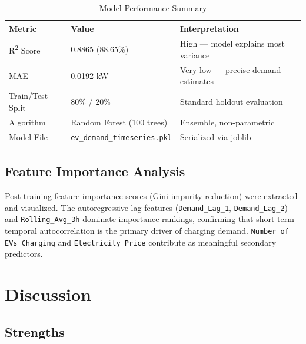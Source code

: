 \documentclass[12pt, a4paper]{article}
\begin{document}
\vspace{0.6em}

\begin{table}[h!]
\centering
\caption{Model Performance Summary}
\renewcommand{\arraystretch}{1.4}
\begin{tabular}{lll}
\toprule
\rowcolor{tableheader}
\color{white}\textbf{Metric} &
\color{white}\textbf{Value} &
\color{white}\textbf{Interpretation} \\
\midrule
R\textsuperscript{2} Score & 0.8865 (88.65\%) & High --- model explains most variance \\
\rowcolor{lightgray}
MAE                        & 0.0192 kW        & Very low --- precise demand estimates \\
Train/Test Split           & 80\% / 20\%      & Standard holdout evaluation \\
\rowcolor{lightgray}
Algorithm                  & Random Forest (100 trees) & Ensemble, non-parametric \\
Model File                 & \texttt{ev\_demand\_timeseries.pkl} & Serialized via joblib \\
\bottomrule
\end{tabular}
\end{table}

\subsection{Feature Importance Analysis}

Post-training feature importance scores (Gini impurity reduction) were extracted and
visualized. The autoregressive lag features (\texttt{Demand\_Lag\_1},
\texttt{Demand\_Lag\_2}) and \texttt{Rolling\_Avg\_3h} dominate importance rankings,
confirming that short-term temporal autocorrelation is the primary driver of charging
demand. \texttt{Number of EVs Charging} and \texttt{Electricity Price} contribute as
meaningful secondary predictors.

\section{Discussion}

\subsection{Strengths}
\end{document}
